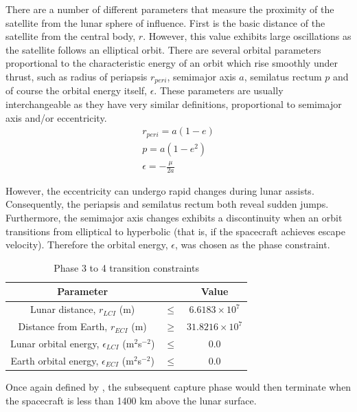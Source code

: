 There are a number of different parameters that measure the proximity of the satellite from the lunar sphere of influence. First is the basic distance of the satellite from the central body, $r$. However, this value exhibits large oscillations as the satellite follows an elliptical orbit. There are several orbital parameters proportional to the characteristic energy of an orbit which rise smoothly under thrust, such as radius of periapsis $r_{peri}$, semimajor axis $a$, semilatus rectum $p$ and of course the orbital energy itself, $\epsilon$. These parameters are usually interchangeable as they have very similar definitions, proportional to semimajor axis and/or eccentricity.
\begin{gather}
r_{peri} = a(1-e)\\
p = a(1-e^2)\\
\epsilon = -\frac{\mu}{2a}
\end{gather}

However, the eccentricity can undergo rapid changes during lunar assists. Consequently, the periapsis and semilatus rectum both reveal sudden jumps. Furthermore, the semimajor axis changes exhibits a discontinuity when an orbit transitions from elliptical to hyperbolic (that is, if the spacecraft achieves escape velocity). Therefore the orbital energy, $\epsilon$, was chosen as the phase constraint.

\begin{table}[h]
\caption{Phase 3 to 4 transition constraints}
\label{tab:Phase-3-4-constraints}
\begin{center}
\begin{tabular} {ccc}\toprule
Parameter & & Value\\\midrule
Lunar distance, $r_{LCI}$ (m) &$\le$& $6.6183\times 10^7$\\\midrule
Distance from Earth, $r_{ECI}$ (m) &$\ge$& $31.8216\times 10^7$\\\midrule
Lunar orbital energy, $\epsilon_{LCI}$ (m$^2$s$^{-2}$) &$\le$& 0.0 \\\midrule
Earth orbital energy, $\epsilon_{ECI}$ (m$^2$s$^{-2}$) &$\le$& 0.0 \\\bottomrule
\end{tabular}
\end{center}
\end{table}

Once again defined by \citeauthor{Roeser2006}, the subsequent capture phase would then terminate when the spacecraft is less than 1400 km above the lunar surface.

